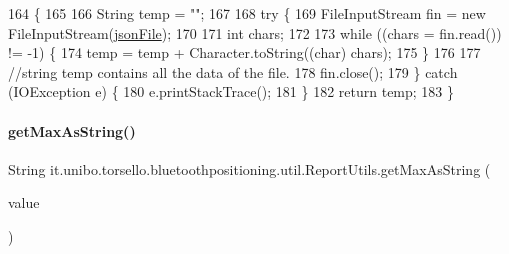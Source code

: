 \begin{DoxyCode}
164                             \{
165 
166         String temp = \textcolor{stringliteral}{""};
167 
168         \textcolor{keywordflow}{try} \{
169             FileInputStream fin = \textcolor{keyword}{new} FileInputStream(\hyperlink{classit_1_1unibo_1_1torsello_1_1bluetoothpositioning_1_1util_1_1ReportUtils_a3d54acab8d9785425b61d7a294444f85_a3d54acab8d9785425b61d7a294444f85}{jsonFile});
170 
171             \textcolor{keywordtype}{int} chars;
172 
173             \textcolor{keywordflow}{while} ((chars = fin.read()) != -1) \{
174                 temp = temp + Character.toString((\textcolor{keywordtype}{char}) chars);
175             \}
176 
177             \textcolor{comment}{//string temp contains all the data of the file.}
178             fin.close();
179         \} \textcolor{keywordflow}{catch} (IOException e) \{
180             e.printStackTrace();
181         \}
182         \textcolor{keywordflow}{return} temp;
183     \}
\end{DoxyCode}
\hypertarget{classit_1_1unibo_1_1torsello_1_1bluetoothpositioning_1_1util_1_1ReportUtils_ada05f889f861205ac0687db4442cad63_ada05f889f861205ac0687db4442cad63}{}\label{classit_1_1unibo_1_1torsello_1_1bluetoothpositioning_1_1util_1_1ReportUtils_ada05f889f861205ac0687db4442cad63_ada05f889f861205ac0687db4442cad63} 
\paragraph{\texorpdfstring{get\+Max\+As\+String()}{getMaxAsString()}}
{\footnotesize\ttfamily String it.\+unibo.\+torsello.\+bluetoothpositioning.\+util.\+Report\+Utils.\+get\+Max\+As\+String (\begin{DoxyParamCaption}\item[{Array\+List$<$ Double $>$}]{value }\end{DoxyParamCaption})\hspace{0.3cm}{\ttfamily [private]}}


